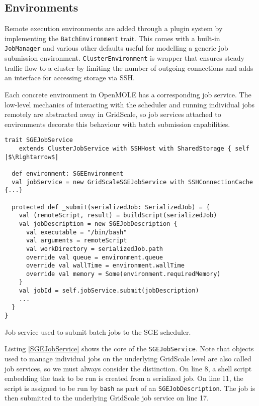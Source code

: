 \subsection{Environments}

Remote execution environments are added through a plugin system by implementing the \verb|BatchEnvironment| trait. This comes with a built-in \verb|JobManager| and various other defaults useful for modelling a generic job submission environment. \verb|ClusterEnvironment| is wrapper that ensures steady traffic flow to a cluster by limiting the number of outgoing connections and adds an interface for accessing storage via SSH.

Each concrete environment in OpenMOLE has a corresponding job service. The low-level mechanics of interacting with the scheduler and running individual jobs remotely are abstracted away in GridScale, so job services attached to environments decorate this behaviour with batch submission capabilities. 

\begin{listing}[h]
	\centering
	\begin{minipage}{14.2cm}
		\begin{verbatim}
trait SGEJobService 
    extends ClusterJobService with SSHHost with SharedStorage { self |$\Rightarrow$|

  def environment: SGEEnvironment
  val jobService = new GridScaleSGEJobService with SSHConnectionCache {...}

  protected def _submit(serializedJob: SerializedJob) = {
    val (remoteScript, result) = buildScript(serializedJob)
    val jobDescription = new SGEJobDescription {
      val executable = "/bin/bash"
      val arguments = remoteScript
      val workDirectory = serializedJob.path
      override val queue = environment.queue
      override val wallTime = environment.wallTime
      override val memory = Some(environment.requiredMemory)
    }
    val jobId = self.jobService.submit(jobDescription)
    ...
  }
}
		\end{verbatim}
	\end{minipage}
	\caption{Job service used to submit batch jobs to the SGE scheduler.}
	\label{SGEJobService}
\end{listing}

Listing \ref{SGEJobService} shows the core of the \verb|SGEJobService|. Note that objects used to manage individual jobs on the underlying GridScale level are also called job services, so we must always consider the distinction. On line 8, a shell script embedding the task to be run is created from a serialized job. On line 11, the script is assigned to be run by \verb|bash| as part of an \verb|SGEJobDescription|. The job is then submitted to the underlying GridScale job service on line 17.

